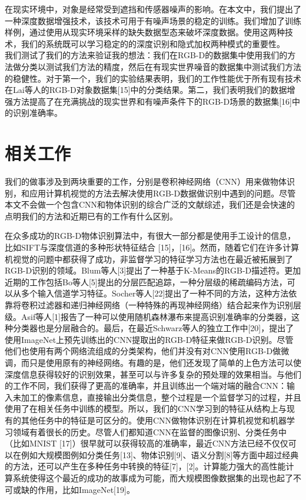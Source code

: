 在现实环境中，对象是经常受到遮挡和传感器噪声的影响。在本文中，我们提出了一种深度数据增强技术，该技术可用于有噪声场景的稳定的训练。我们增加了训练样例，通过使用从现实环境采样的缺失数据型态来破坏深度数据。使用这两种技术，我们的系统既可以学习稳定的的深度识别和隐式加权两种模式的重要性。
 
我们测试了我们的方法来验证我的想法：我们在RGB-D的数据集中使用我们的方法做分类以测试我们方法的精度，然后在有现实世界噪音的数据集中测试我们方法的稳健性。对于第一个，我们的实验结果表明，我们的工作性能优于所有现有技术在Lai等人的RGB-D对象数据集[15]中的分类结果。第二，我们表明我们的数据增强方法提高了在充满挑战的现实世界和有噪声条件下的RGB-D场景的数据集[16]中的识别准确率。

\section{相关工作}

我们的做事涉及到两块重要的工作，分别是卷积神经网络（CNN）用来做物体识别，和应用计算机视觉的方法去解决使用RGB-D数据做识别中遇到的问题。尽管本文不会做一个包含CNN和物体识别的综合广泛的文献综述，我们还是会快速的点明我们的方法和近期已有的工作有什么区别。

在众多成功的RGB-D物体识别算法中，有很大一部分都是使用手工设计的信息，比如SIFT与深度信道的多种形状特征结合 [15]，[16]。然而，随着它们在许多计算机视觉的问题中都获得了成功，非监督学习的特征学习方法也在最近被拓展到了RGB-D识别的领域。Blum等人[3]提出了一种基于K-Means的RGB-D描述符。更加近期的工作包括Bo等人[5]提出的分层匹配追踪，一种分层级的稀疏编码方法，可以从多个输入信道学习特征。Socher等人[22]提出了一种不同的方法，这种方法依靠将卷积过滤器和递归神经网络（一种特殊的再现神经网络）结合起来作为识别层级。Asif等人[1]报告了一种可以使用随机森林瀑布来提高识别准确率的分类器，这种分类器也是分层融合的。最后，在最近Schwarz等人的独立工作中[20]，提出了使用ImageNet上预先训练出的CNN提取出的RGB-D特征来做RGB-D识别。尽管他们也使用有两个网络流组成的分类架构，他们并没有对CNN使用RGB-D做微调，而只是使用原有的神经网络。有趣的是，他们还发现了简单的上色方法可以使深度信息获得较好的识别效果，甚至可以与许多复杂的预处理的效果相当。与他们的工作不同，我们获得了更高的准确率，并且训练出一个端对端的融合CNN：输入未加工的像素信息，直接输出分类信息，整个过程是一个监督学习的过程，并且使用了在相关任务中训练的模型。所以，我们的CNN学习到的特征从结构上与现有的其他任务中的特征是可区分的。使用CNN做物体识别在计算机视觉和机器学习领域有着很长的历史。尽管人们都知道CNN在监督的图像识别、分类任务中（比如MNIST [17]）很早就可以获得较高的准确率，最近CNN方法已经不仅仅可以在例如大规模图例如分类任务[13]、物体识别[9]、语义分割[8]等方面中超过经典的方法，还可以产生在多种任务中转换的特征[7]，[2]。计算能力强大的高性能计算系统使得这个最近的成功的故事成为可能，而大规模图像数据集的出现也起了不可或缺的作用，比如ImageNet[19]。




